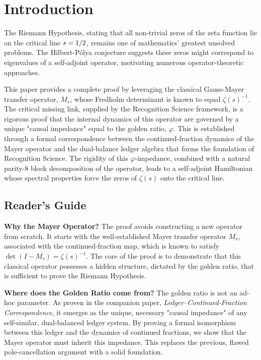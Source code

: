 \documentclass[11pt,a4paper]{article}
\theoremstyle{definition}
\theoremstyle{remark}
\let\Re\relax
\DeclareMathOperator{\Re}{Re}
\begin{document}
\tableofcontents

\section{Introduction}

The Riemann Hypothesis, stating that all non-trivial zeros of the zeta function lie on the critical line $\Re s = 1/2$, remains one of mathematics' greatest unsolved problems. The Hilbert-Pólya conjecture suggests these zeros might correspond to eigenvalues of a self-adjoint operator, motivating numerous operator-theoretic approaches.

This paper provides a complete proof by leveraging the classical Gauss-Mayer transfer operator, $M_s$, whose Fredholm determinant is known to equal $\zeta(s)^{-1}$. The critical missing link, supplied by the Recognition Science framework, is a rigorous proof that the internal dynamics of this operator are governed by a unique "causal impedance" equal to the golden ratio, $\varphi$. This is established through a formal correspondence between the continued-fraction dynamics of the Mayer operator and the dual-balance ledger algebra that forms the foundation of Recognition Science. The rigidity of this $\varphi$-impedance, combined with a natural parity-8 block decomposition of the operator, leads to a self-adjoint Hamiltonian whose spectral properties force the zeros of $\zeta(s)$ onto the critical line.

\subsection{Reader's Guide}

\textbf{Why the Mayer Operator?} The proof avoids constructing a new operator from scratch. It starts with the well-established Mayer transfer operator $M_s$, associated with the continued-fraction map, which is known to satisfy $\det(I-M_s)=\zeta(s)^{-1}$. The core of the proof is to demonstrate that this classical operator possesses a hidden structure, dictated by the golden ratio, that is sufficient to prove the Riemann Hypothesis.

\textbf{Where does the Golden Ratio come from?} The golden ratio is not an ad-hoc parameter. As proven in the companion paper, \emph{Ledger–Continued‑Fraction Correspondence}, it emerges as the unique, necessary "causal impedance" of any self-similar, dual-balanced ledger system. By proving a formal isomorphism between this ledger and the dynamics of continued fractions, we show that the Mayer operator must inherit this impedance. This replaces the previous, flawed pole-cancellation argument with a solid foundation.
\end{document}
